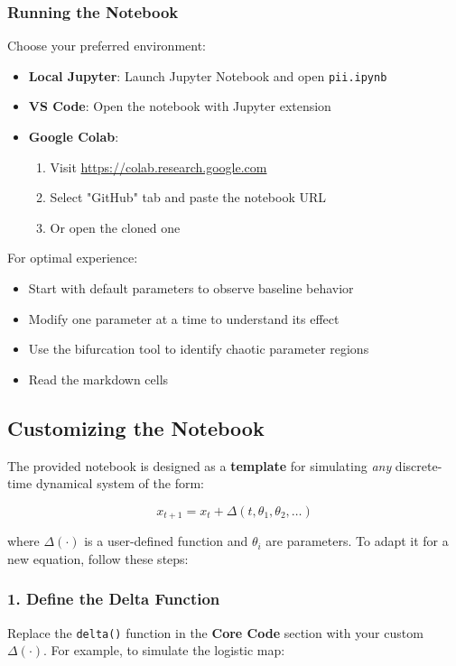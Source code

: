 \documentclass[a4paper, 10pt]{article}
\begin{document}
\subsubsection{Running the Notebook}
Choose your preferred environment:
\begin{itemize}
	\item \textbf{Local Jupyter}: Launch Jupyter Notebook and open \texttt{pii.ipynb}
	\item \textbf{VS Code}: Open the notebook with Jupyter extension
	\item \textbf{Google Colab}:
	      \begin{enumerate}
		      \item Visit \url{https://colab.research.google.com}
		      \item Select "GitHub" tab and paste the notebook URL
		      \item Or open the cloned one
	      \end{enumerate}
\end{itemize}

For optimal experience:
\begin{itemize}
	\item Start with default parameters to observe baseline behavior
	\item Modify one parameter at a time to understand its effect
	\item Use the bifurcation tool to identify chaotic parameter regions
	\item Read the markdown cells
\end{itemize}

\subsection{Customizing the Notebook}
The provided notebook is designed as a \textbf{template} for simulating \textit{any} discrete-time dynamical system of the form:

\begin{equation}
	x_{t+1} = x_t + \Delta(t, \theta_1, \theta_2, \dots)
\end{equation}

where \(\Delta(\cdot)\) is a user-defined function and \(\theta_i\) are parameters. To adapt it for a new equation, follow these steps:

\subsubsection*{1. Define the Delta Function}
Replace the \texttt{delta()} function in the \textbf{Core Code} section with your custom \(\Delta(\cdot)\). For example, to simulate the logistic map:
\end{document}
